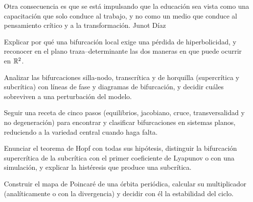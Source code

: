 
  {Otra consecuencia es que se está impulsando que la educación sea vista como una capacitación que solo conduce al trabajo, y no como un medio que conduce al pensamiento crítico y a la transformación.}
  {Junot Díaz}

\begin{objetivos}
  \item Explicar por qué una bifurcación local exige una pérdida de hiperbolicidad, y reconocer en el plano traza--determinante las dos maneras en que puede ocurrir en $\mathbb{R}^2$.
  \item Analizar las bifurcaciones silla-nodo, transcrítica y de horquilla (supercrítica y subcrítica) con líneas de fase y diagramas de bifurcación, y decidir cuáles sobreviven a una perturbación del modelo.
  \item Seguir una receta de cinco pasos (equilibrios, jacobiano, cruce, transversalidad y no degeneración) para encontrar y clasificar bifurcaciones en sistemas planos, reduciendo a la variedad central cuando haga falta.
  \item Enunciar el teorema de Hopf con todas sus hipótesis, distinguir la bifurcación supercrítica de la subcrítica con el primer coeficiente de Lyapunov o con una simulación, y explicar la histéresis que produce una subcrítica.
  \item Construir el mapa de Poincaré de una órbita periódica, calcular su multiplicador (analíticamente o con la divergencia) y decidir con él la estabilidad del ciclo.
\end{objetivos}










